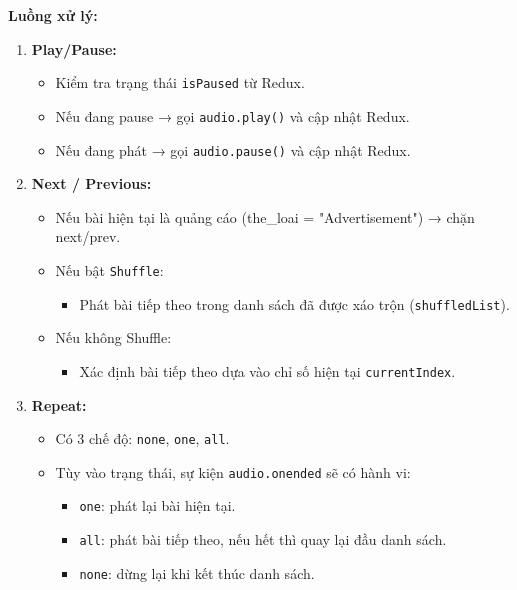 \textbf{Luồng xử lý:}
\begin{enumerate}
  \item \textbf{Play/Pause:}
  \begin{itemize}
    \item Kiểm tra trạng thái \texttt{isPaused} từ Redux.
    \item Nếu đang pause → gọi \texttt{audio.play()} và cập nhật Redux.
    \item Nếu đang phát → gọi \texttt{audio.pause()} và cập nhật Redux.
  \end{itemize}

  \item \textbf{Next / Previous:}
  \begin{itemize}
    \item Nếu bài hiện tại là quảng cáo (the\_loai = "Advertisement") → chặn next/prev.
    \item Nếu bật \texttt{Shuffle}:
    \begin{itemize}
      \item Phát bài tiếp theo trong danh sách đã được xáo trộn (\texttt{shuffledList}).
    \end{itemize}
    \item Nếu không Shuffle:
    \begin{itemize}
      \item Xác định bài tiếp theo dựa vào chỉ số hiện tại \texttt{currentIndex}.
    \end{itemize}
  \end{itemize}

  \item \textbf{Repeat:}
  \begin{itemize}
    \item Có 3 chế độ: \texttt{none}, \texttt{one}, \texttt{all}.
    \item Tùy vào trạng thái, sự kiện \texttt{audio.onended} sẽ có hành vi:
    \begin{itemize}
      \item \texttt{one}: phát lại bài hiện tại.
      \item \texttt{all}: phát bài tiếp theo, nếu hết thì quay lại đầu danh sách.
      \item \texttt{none}: dừng lại khi kết thúc danh sách.
    \end{itemize}
  \end{itemize}


\end{enumerate}
